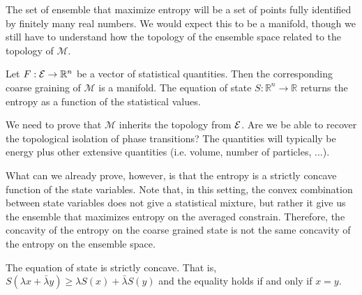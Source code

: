 The set of ensemble that maximize entropy will be a set of points fully identified by finitely many real numbers. We would expect this to be a manifold, though we still have to understand how the topology of the ensemble space related to the topology of $\mathcal{M}$.

\begin{conj}
	Let $F : \mathcal{E} \to \mathbb{R}^n$ be a vector of statistical quantities. Then the corresponding coarse graining of $\mathcal{M}$ is a manifold. The equation of state $S : \mathbb{R}^n \to \mathbb{R}$ returns the entropy as a function of the statistical values.
\end{conj}

\begin{remark}
	We need to prove that $\mathcal{M}$ inherits the topology from $\mathcal{E}$. Are we be able to recover the topological isolation of phase transitions? The quantities will typically be energy plus other extensive quantities (i.e. volume, number of particles, ...).
\end{remark}

What can we already prove, however, is that the entropy is a strictly concave function of the state variables. Note that, in this setting, the convex combination between state variables does not give a statistical mixture, but rather it give us the ensemble that maximizes entropy on the averaged constrain. Therefore, the concavity of the entropy on the coarse grained state is not the same concavity of the entropy on the ensemble space.

\begin{prop}
	The equation of state is strictly concave. That is, $S(\lambda x + \bar{\lambda} y) \geq \lambda S(x) + \bar{\lambda} S(y)$ and the equality holds if and only if $x=y$.
\end{prop}

